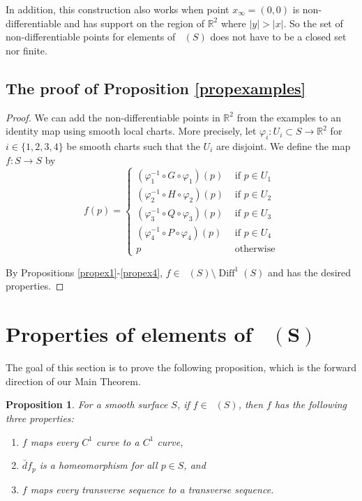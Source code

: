 \documentclass[sn-mathphys-num]{sn-jnl}%
\theoremstyle{thmstyleone}%
\newtheorem{prop}[theorem]{Proposition}%
\theoremstyle{thmstyletwo}%
\theoremstyle{thmstylethree}%
\DeclareMathOperator{\diff}{Diff}
\DeclareMathOperator{\thomeo}{Homeo^{1}}
\DeclareMathOperator{\bthomeo}{\textbf{Homeo}^{\textbf{1}}}
\begin{document}
In addition,  this construction also works when point $x_{\infty} = (0,0)$ is non-differentiable and has support on the region of $\mathbb{R}^2$ where $|y|>|x|$.   So the set of non-differentiable points for elements of $\thomeo(S)$ does not have to be a closed set nor finite.


\subsection{The proof of Proposition \ref{propexamples}}

\begin{proof}
We can add the non-differentiable points in $\mathbb{R}^2$ from the examples to an identity map using smooth local charts. 
More precisely,  let $\varphi_i: U_i \subset S \rightarrow \mathbb{R}^2$ for $i\in\{1, 2, 3, 4\}$ be smooth charts such that the $U_i$ are disjoint.
We define the map $f: S \rightarrow S$ by 
$$f(p) = \left\{ \begin{array}{ll} (\varphi_1^{-1} \circ G \circ \varphi_1)(p) & \mbox{ if } p \in U_1 \\
(\varphi_2^{-1} \circ H \circ \varphi_2)(p) & \mbox{ if } p \in U_2 \\
(\varphi_3^{-1} \circ Q \circ \varphi_3)(p) & \mbox{ if } p \in U_3 \\
(\varphi_4^{-1} \circ P \circ \varphi_4)(p) & \mbox{ if } p \in U_4 \\
p & \mbox{ otherwise}
\end{array} \right.$$

By Propositions \ref{propex1}-\ref{propex4},  $f \in \thomeo(S){\setminus}\diff^1(S)$ and has the desired properties.
\end{proof}

\section{Properties of elements of $\mathbf{\bthomeo(S)}$}\label{sectionforward}

The goal of this section is to prove the following proposition,  which is the forward direction of our Main Theorem.

\begin{prop}\label{propthm2forward}
For a smooth surface $S$, if $f \in \thomeo(S)$,  then $f$ has the following three properties:
\begin{enumerate}[noitemsep,topsep=0pt, label=$(\alph*)$]
\item $f$ maps every $C^1$ curve to a $C^1$ curve,
\item $\bar{d}f_p$ is a homeomorphism for all $p \in S$, and 
\item $f$ maps every transverse sequence to a transverse sequence.
\end{enumerate}
\end{prop}
\end{document}
